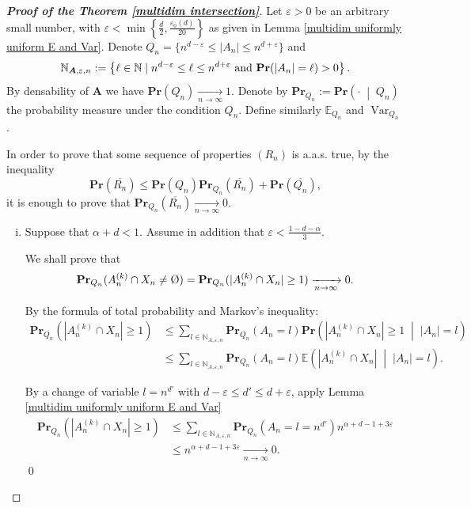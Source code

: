 \documentclass{article}
\DeclareMathOperator{\Var}{Var}
\newcommand{\vide}{\textup{\O}}
\newcommand{\bs}{\boldsymbol}
\newcommand{\tendvers}{\xrightarrow[n\to\infty]{}}
\def\Pr{\mathbf{Pr}}
\newcommand\PrCond[2]{\Pr\left( #1 \;\middle|\; #2 \right)}
\newcommand\Cond[2]{\left( #1 \;\middle|\; #2 \right)}
\theoremstyle{remark}
\begin{document}
\begin{proof}[\textbf{Proof of the Theorem \ref{multidim intersection}}] \quad

Let $\varepsilon >0$ be an arbitrary small number, with $\varepsilon < \min\left\{\frac{d}{2},\frac{\varepsilon_0(d)}{20}\right\}$ as given in Lemma \ref{multidim uniformly uniform E and Var}. Denote $Q_n = \{n^{d-\varepsilon}\leq |A_n| \leq n^{d+\varepsilon}\}$ and 
    \[\mathbb{N}_{\bs A,\varepsilon,n} := \left\{\ell\in\mathbb{N} \;|\; n^{d-\varepsilon}\leq \ell \leq n^{d+\varepsilon}\textup{ and } \Pr(|A_n| = \ell)>0\right\}.\]
By densability of $\bs A$ we have $\Pr(Q_n)\tendvers 1$. Denote by $\Pr_{Q_n}:=\PrCond{\cdot}{Q_n}$ the probability measure under the condition $Q_n$. Define similarly $\mathbb{E}_{Q_n}$ and $\Var_{Q_n}$.

In order to prove that some sequence of properties $(R_n)$ is a.a.s. true, by the inequality
\[\Pr(\overline{R_n})\leq \Pr(Q_n)\Pr_{Q_n}({\overline{R_n}}) + \Pr(\overline{Q_n}),\]
it is enough to prove that $\Pr_{Q_n}({\overline{R_n}})\tendvers 0$.

\begin{enumerate}[(i)]
    \item Suppose that $\alpha+d<1$. Assume in addition that $\varepsilon < \frac{1-d-\alpha}{3}$.
    
    We shall prove that \[\Pr_{Q_n}(A_n^{(k)}\cap X_n \neq \vide) = \Pr_{Q_n}(|A_n^{(k)}\cap X_n| \geq 1)\tendvers 0.\]
    
     By the formula of total probability and Markov's inequality:
    \begin{align*} \Pr_{Q_n}\left(|A_n^{(k)}\cap X_n|\geq 1 \right)
    & \leq \sum_{l\in \mathbb{N}_{A,\varepsilon,n}}\Pr_{Q_n}(A_n = l) \Pr\Cond{|A_n^{(k)}\cap X_n|\geq 1}{|A_n| = l}\\
    & \leq \sum_{l\in \mathbb{N}_{A,\varepsilon,n}}\Pr_{Q_n}(A_n = l) \mathbb{E}\Cond{|A_n^{(k)}\cap X_n|}{|A_n| = l}.
    \end{align*}
    
    By a change of variable $l = n^{d'}$ with $d-\varepsilon\leq d'\leq d+\varepsilon$, apply Lemma \ref{multidim uniformly uniform E and Var}
    \begin{align*} \Pr_{Q_n}\left(|A_n^{(k)}\cap X_n|\geq 1 \right)
    & \leq \sum_{l\in \mathbb{N}_{A,\varepsilon,n}}\Pr_{Q_n}(A_n=l=n^{d'}) n^{\alpha+d-1+3\varepsilon}\\
    & \leq n^{\alpha+d-1+3\varepsilon}\tendvers 0.
    \end{align*}\qed


\end{enumerate}
\end{proof}
\end{document}
